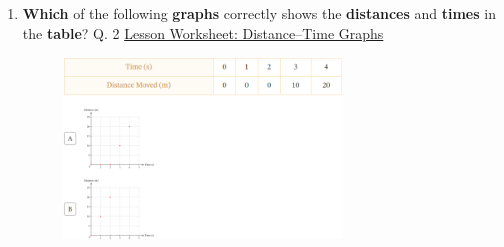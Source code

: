 \documentclass[A4,12pt]{article}
\begin{document}
\begin{enumerate}[label=\bfseries (\arabic*)]














\item \textbf{Which} of the following \textbf{graphs} correctly shows the \textbf{distances} and \textbf{times} in the \textbf{table}? \cite{Nagwa} Q. 2 \href{https://www.nagwa.com/en/worksheets/932192593730/}{Lesson Worksheet: Distance–Time Graphs}\\
%
\begin{figure}[H]
    \centering
    \includegraphics[width=0.7\textwidth]{Nagwa_Q2_kin.png}
\end{figure}
%

















\end{enumerate}
\end{document}
